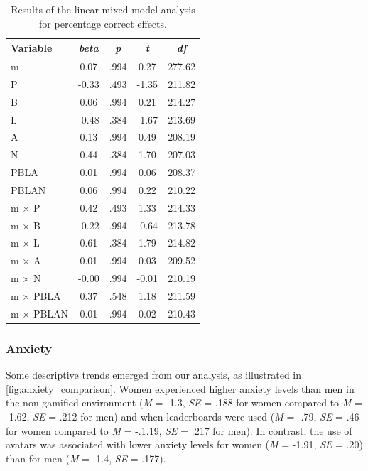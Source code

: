 \begin{table}[h]
    \centering
    \caption{Results of the linear mixed model analysis for percentage correct effects.}
    \label{tab:lmm_performance}
    \begin{tabular}{lcccc}
        \hline
        Variable & \textit{beta} & \textit{p} & \textit{t} & \textit{df} \\
        \hline
        m & 0.07 & .994 & 0.27 & 277.62 \\
        P & -0.33 & .493 & -1.35 & 211.82 \\
        B & 0.06 & .994 & 0.21 & 214.27 \\
        L & -0.48 & .384 & -1.67 & 213.69 \\
        A & 0.13 & .994 & 0.49 & 208.19 \\
        N & 0.44 & .384 & 1.70 & 207.03 \\
        PBLA & 0.01 & .994 & 0.06 & 208.37 \\
        PBLAN & 0.06 & .994 & 0.22 & 210.22 \\
        m $\times$ P & 0.42 & .493 & 1.33 & 214.33 \\
        m $\times$ B & -0.22 & .994 & -0.64 & 213.78 \\
        m $\times$ L & 0.61 & .384 & 1.79 & 214.82 \\
        m $\times$ A & 0.01 & .994 & 0.03 & 209.52 \\
        m $\times$ N & -0.00 & .994 & -0.01 & 210.19 \\
        m $\times$ PBLA & 0.37 & .548 & 1.18 & 211.59 \\
        m $\times$ PBLAN & 0.01 & .994 & 0.02 & 210.43 \\
        \hline
    \end{tabular}
\end{table}




\subsubsection{Anxiety}
Some descriptive trends emerged from our analysis, as illustrated in \autoref{fig:anxiety_comparison}.
Women experienced higher anxiety levels than men in the non-gamified environment (\textit{M} = -1.3, \textit{SE} = .188 for women compared to \textit{M} = -1.62, \textit{SE} = .212 for men) and when leaderboards were used (\textit{M} = -.79, \textit{SE} = .46 for women compared to \textit{M} = -.1.19, \textit{SE} = .217 for men).
In contrast, the use of avatars was associated with lower anxiety levels for women (\textit{M} = -1.91, \textit{SE} = .20) than for men (\textit{M} = -1.4, \textit{SE} = .177).

